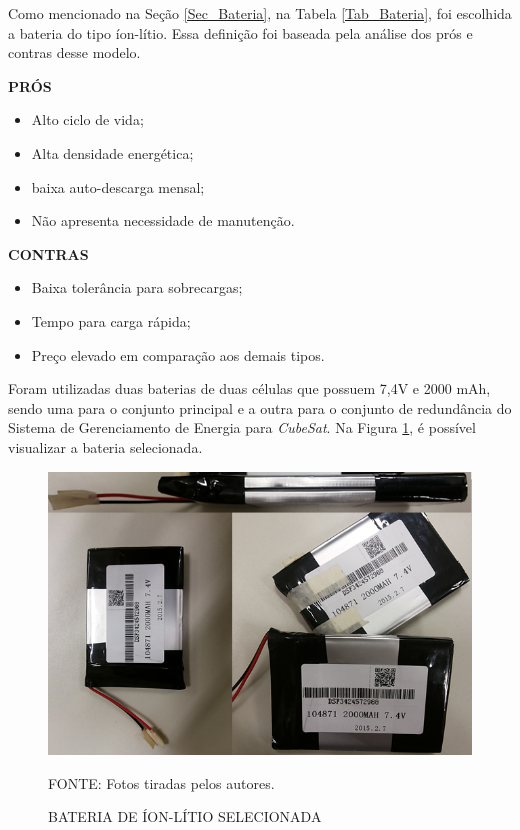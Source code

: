 \documentclass[
	12pt,				%
	openright,			%
	oneside,			%
	a4paper,			%
	english,			%
	french,				%
	spanish,			%
	brazil,				%
	oldfontcommands
	]{abntex2}
\begin{document}
	Como mencionado na Seção \ref{Sec_Bateria}, na Tabela \ref{Tab_Bateria}, foi escolhida a bateria do tipo íon-lítio. Essa definição foi baseada pela análise dos prós e contras desse modelo.
	
	\begin{minipage}{6cm}
		\begin{center}
			\textbf{PRÓS}
		\end{center}
		
		\begin{itemize}
			\item Alto ciclo de vida;
			\item Alta densidade energética;
			\item baixa auto-descarga mensal;
			\item Não apresenta necessidade de manutenção.
		\end{itemize}
	
	\end{minipage}
	\begin{minipage}{7cm}
		\begin{center}
			\textbf{CONTRAS}
		\end{center}
		
		\begin{itemize}
			\item Baixa tolerância para sobrecargas;
			\item Tempo para carga rápida;
			\item Preço elevado em comparação aos demais tipos.
		\end{itemize}
		
	\end{minipage}
		
	Foram utilizadas duas baterias de duas células que possuem 7,4V e 2000 mAh, sendo uma para o conjunto principal e a outra para o conjunto de redundância do Sistema de Gerenciamento de Energia para \textit{CubeSat}. Na Figura \ref{Fig_Bat_Sel}, é possível visualizar a bateria selecionada.
	
	\begin{figure}[th]
		\caption{BATERIA DE ÍON-LÍTIO SELECIONADA}
		\label{Fig_Bat_Sel}
		\centering
		\includegraphics[width=0.8\linewidth]{./figs/cubesat_04}
			
		\begin{small}
			FONTE: Fotos tiradas pelos autores.
		\end{small}
	\end{figure}
	\pagebreak
		
\end{document}
